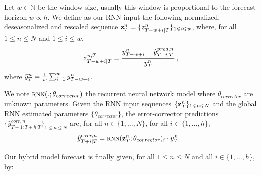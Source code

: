 \documentclass{article} %
\newcommand{\ts}{y}
\newcommand{\tspred}{\hat{\ts}}
\newcommand{\lag}{h}
\newcommand{\window}{w}
\newcommand{\meants}{\Bar{\ts}}
\newcommand{\rnnwindow}{{\bf \rnninput}}
\newcommand{\rnninput}{z}
\newcommand{\rnn}{\textsc{rnn}}
\newcommand{\rnnparam}{\theta_{corrector}}
\newcommand{\predictor}{\mathrm{RNN}_p}
\newcommand{\classifier}{\mathrm{RNN}_c}
\newcommand{\remainder}{r}
\newcommand{\hiddenregime}{U}
\begin{document}


Let $\window \in \mathbb{N}$ be the window size, usually this window is proportional to the forecast horizon $\window \propto \lag$. We define as our RNN input the following  normalized, deseasonalized and rescaled sequence $\rnnwindow^n_T = \{\rnninput^{n}_{T-\window+i|T}\}_{1\leqslant i \leqslant w}$, where, for all $1\leqslant n \leqslant N$ and $1\leqslant i \leqslant w$, 
$$
\rnninput^{n,T}_{T-w+i|T} = \frac{\ts^n_{T-w+i} -\tspred^{pred,n}_{T+i|T}}{\meants^n_T}\,,
$$
where $ \meants^n_T = \frac{1}{w}\sum_{i = 1}^{w}\ts^n_{T-w+i}$.

We note $\rnn(.;\rnnparam)$ the recurrent neural network model where $\rnnparam$ are  unknown parameters. Given the RNN input sequences $\{\rnnwindow^n_T\}_{1\leqslant n \leqslant N}$ and the global RNN estimated parameters $\{\rnnparam\}$, the error-corrector predictions $\{\tspred^{corr,n}_{T+1:T+\lag|T}\}_{1\leqslant n \leqslant N}$ are, for all $n \in \{1,\ldots,N\}$, for all $i \in \{1,\ldots,\lag\}$,
$$
\tspred^{corr,n}_{T+i|T} = \rnn(\rnnwindow^n_T;\rnnparam)_i \cdot \meants^n_T\ \,.
$$

Our hybrid model forecast is finally given, for all $1\leqslant n \leqslant N$ and all $i \in \{1,\ldots,\lag\}$, by:
\end{document}
